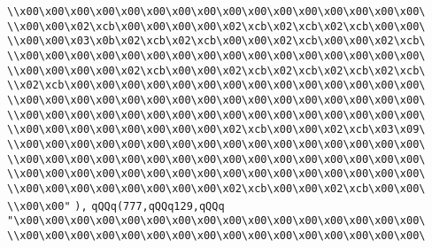 \verb|\\x00\x00\x00\x00\x00\x00\x00\x00\x00\x00\x00\x00\x00\x00\x00\x00\|\newline
\verb|\\x00\x00\x02\xcb\x00\x00\x00\x00\x02\xcb\x02\xcb\x02\xcb\x00\x00\|\newline
\verb|\\x00\x00\x03\x0b\x02\xcb\x02\xcb\x00\x00\x02\xcb\x00\x00\x02\xcb\|\newline
\verb|\\x00\x00\x00\x00\x00\x00\x00\x00\x00\x00\x00\x00\x00\x00\x00\x00\|\newline
\verb|\\x00\x00\x00\x00\x02\xcb\x00\x00\x02\xcb\x02\xcb\x02\xcb\x02\xcb\|\newline
\verb|\\x02\xcb\x00\x00\x00\x00\x00\x00\x00\x00\x00\x00\x00\x00\x00\x00\|\newline
\verb|\\x00\x00\x00\x00\x00\x00\x00\x00\x00\x00\x00\x00\x00\x00\x00\x00\|\newline
\verb|\\x00\x00\x00\x00\x00\x00\x00\x00\x00\x00\x00\x00\x00\x00\x00\x00\|\newline
\verb|\\x00\x00\x00\x00\x00\x00\x00\x00\x02\xcb\x00\x00\x02\xcb\x03\x09\|\newline
\verb|\\x00\x00\x00\x00\x00\x00\x00\x00\x00\x00\x00\x00\x00\x00\x00\x00\|\newline
\verb|\\x00\x00\x00\x00\x00\x00\x00\x00\x00\x00\x00\x00\x00\x00\x00\x00\|\newline
\verb|\\x00\x00\x00\x00\x00\x00\x00\x00\x00\x00\x00\x00\x00\x00\x00\x00\|\newline
\verb|\\x00\x00\x00\x00\x00\x00\x00\x00\x02\xcb\x00\x00\x02\xcb\x00\x00\|\newline
\verb|\\x00\x00"|\newline
\verb|),|\newline
\verb|qQQq(777,qQQq129,qQQq|\newline
\verb|"\x00\x00\x00\x00\x00\x00\x00\x00\x00\x00\x00\x00\x00\x00\x00\x00\|\newline
\verb|\\x00\x00\x00\x00\x00\x00\x00\x00\x00\x00\x00\x00\x00\x00\x00\x00\|\newline
